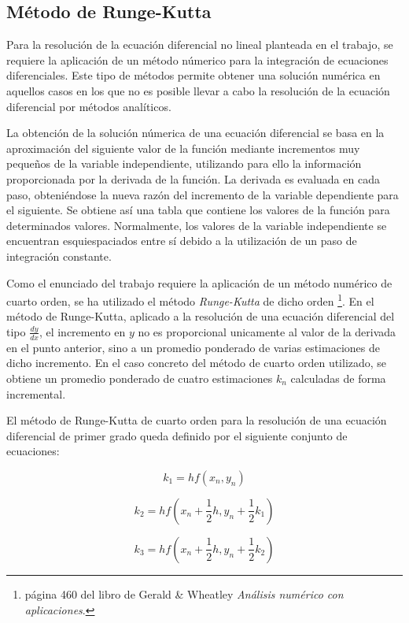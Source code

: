 \documentclass[11pt]{article}
\begin{document}
\subsection{Método de Runge-Kutta}
Para la resolución de la ecuación diferencial no lineal planteada en el trabajo,
se requiere la aplicación de un método númerico para la integración de
ecuaciones diferenciales. Este tipo de métodos permite obtener una solución
numérica en aquellos casos en los que no es posible llevar a cabo la resolución
de la ecuación diferencial por métodos analíticos. 

La obtención de la solución númerica de una ecuación diferencial se basa en la
aproximación del siguiente valor de la función mediante incrementos muy pequeños
de la variable independiente, utilizando para ello la información proporcionada
por la derivada de la función. La derivada es evaluada en cada paso,
obteniéndose la nueva razón del incremento de la variable dependiente para el
siguiente. Se obtiene así una tabla que contiene los valores de la función para
determinados valores. Normalmente, los valores de la variable independiente se
encuentran esquiespaciados entre sí debido a la utilización de un paso de
integración constante.

Como el enunciado del trabajo requiere la aplicación de un método numérico de
cuarto orden, se ha utilizado el método \textit{Runge-Kutta} de dicho orden
\footnote{página 460 del libro de Gerald \& Wheatley \textit{Análisis numérico
con aplicaciones}.}. En el método de Runge-Kutta, aplicado a la resolución de
una ecuación diferencial del tipo $\frac{dy}{dx}$, el incremento en $y$ no es
proporcional unicamente al valor de la derivada en el punto anterior, sino a un
promedio ponderado de varias estimaciones de dicho incremento. En el caso
concreto del método de cuarto orden utilizado, se obtiene un promedio ponderado
de cuatro estimaciones $k_n$ calculadas de forma incremental.

El método de Runge-Kutta de cuarto orden para la resolución de una ecuación
diferencial de primer grado queda definido por el siguiente conjunto de
ecuaciones:

\begin{equation}
	k_1 = hf(x_n, y_n)
\end{equation}

\begin{equation}
	k_2 = hf(x_n + \frac{1}{2}h, y_n + \frac{1}{2}k_1)
\end{equation}

\begin{equation}
	k_3 = hf(x_n + \frac{1}{2}h, y_n + \frac{1}{2}k_2)
\end{equation}
\end{document}
